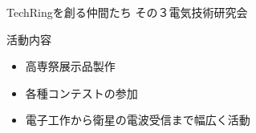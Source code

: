 \documentclass[dvipdfmx]{beamer}
\begin{document}
\begin{frame}{TechRingを創る仲間たち その３}{電気技術研究会}

  \vspace{-2mm}
  
  \begin{minipage}{0.85\textwidth}
    \begin{block}{活動内容}
      \begin{itemize}
        \item 高専祭展示品製作
        \item 各種コンテストの参加
        \item 電子工作から衛星の電波受信まで幅広く活動
      \end{itemize}
    \end{block}
  \end{minipage}

  \vspace{-2mm}


\end{frame}
\end{document}
